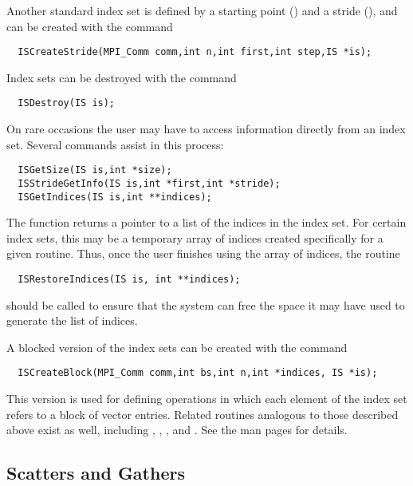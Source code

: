 Another standard index set is defined by a starting point () and a
stride (),  and can be created with the command
\begin{verbatim}
  ISCreateStride(MPI_Comm comm,int n,int first,int step,IS *is);
\end{verbatim}

Index sets can be destroyed with the command 
\begin{verbatim}
  ISDestroy(IS is); 
\end{verbatim}

On rare occasions the user may have to access information directly 
from an index set.  
Several commands  
assist in this process:
\begin{verbatim}
  ISGetSize(IS is,int *size);
  ISStrideGetInfo(IS is,int *first,int *stride);
  ISGetIndices(IS is,int **indices);
\end{verbatim}
The function  returns a pointer to a list of the 
indices in the index set. 
For certain index sets, this may be a 
temporary array of indices created specifically for a given routine. 
Thus, once the user finishes using the array of indices, 
the routine 
\begin{verbatim}
  ISRestoreIndices(IS is, int **indices); 
\end{verbatim}
should be called to ensure that the system can free the space it 
may have used to generate the list of indices.

A blocked version of the index sets can be created with the command
\begin{verbatim}
  ISCreateBlock(MPI_Comm comm,int bs,int n,int *indices, IS *is);
\end{verbatim}
This version is used for defining operations in which each element of the index
set refers to a block of  vector entries.  Related routines analogous
to those described above exist as well, including
, , ,
and . See the man pages for details.
  

\subsection{Scatters and Gathers}  
\label{sec:scatter}

